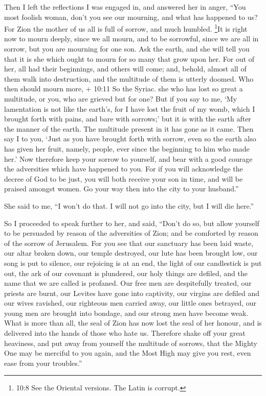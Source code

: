  Then I left the reflections I was engaged in, and answered
her in anger,  ``You most foolish woman, don't you see our
mourning, and what has happened to us?  For Zion the mother
of us all is full of sorrow, and much humbled. 
\footnote{10:8 See the Oriental versions. The Latin is corrupt.}It is
right now to mourn deeply, since we all mourn, and to be sorrowful,
since we are all in sorrow, but you are mourning for one son.
 Ask the earth, and she will tell you that it is she which
ought to mourn for so many that grow upon her.  For out of
her, all had their beginnings, and others will come; and, behold, almost
all of them walk into destruction, and the multitude of them is utterly
doomed.  Who then should mourn more, + 10:11 So the Syriac.
she who has lost so great a multitude, or you, who are grieved but for
one?  But if you say to me, `My lamentation is not like the
earth's, for I have lost the fruit of my womb, which I brought forth
with pains, and bare with sorrows;'  but it is with the
earth after the manner of the earth. The multitude present in it has
gone as it came.  Then say I to you, `Just as you have
brought forth with sorrow, even so the earth also has given her fruit,
namely, people, ever since the beginning to him who made her.'
 Now therefore keep your sorrow to yourself, and bear with
a good courage the adversities which have happened to you. 
For if you will acknowledge the decree of God to be just, you will both
receive your son in time, and will be praised amongst women.
 Go your way then into the city to your husband.''

 She said to me, ``I won't do that. I will not go into the
city, but I will die here.''

 So I proceeded to speak further to her, and said,
 ``Don't do so, but allow yourself to be persuaded by
reason of the adversities of Zion; and be comforted by reason of the
sorrow of Jerusalem.  For you see that our sanctuary has
been laid waste, our altar broken down, our temple destroyed,
 our lute has been brought low, our song is put to silence,
our rejoicing is at an end, the light of our candlestick is put out, the
ark of our covenant is plundered, our holy things are defiled, and the
name that we are called is profaned. Our free men are despitefully
treated, our priests are burnt, our Levites have gone into captivity,
our virgins are defiled and our wives ravished, our righteous men
carried away, our little ones betrayed, our young men are brought into
bondage, and our strong men have become weak.  What is more
than all, the seal of Zion has now lost the seal of her honour, and is
delivered into the hands of those who hate us.  Therefore
shake off your great heaviness, and put away from yourself the multitude
of sorrows, that the Mighty One may be merciful to you again, and the
Most High may give you rest, even ease from your troubles.''

